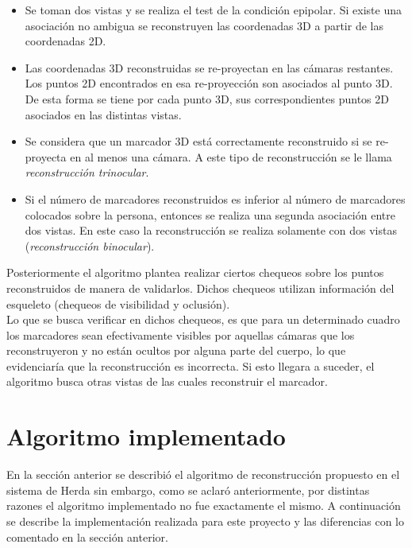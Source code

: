 \begin{itemize}
\item Se toman dos vistas y se realiza el test de la condición epipolar. Si existe una asociación no ambigua se reconstruyen  las coordenadas 3D a partir de las coordenadas 2D.

\item Las coordenadas 3D reconstruidas se re-proyectan en las cámaras restantes. Los puntos 2D encontrados en esa re-proyección son asociados al punto 3D. De esta forma se tiene por cada punto 3D, sus correspondientes puntos 2D asociados en las distintas vistas.\

\item Se considera que un marcador 3D está correctamente reconstruido si se re-proyecta en al menos una cámara. A este tipo de reconstrucción se le llama \textit{reconstrucción trinocular}.\\

\item Si el número de marcadores reconstruidos es inferior al número de marcadores colocados sobre la persona, entonces se realiza una segunda asociación entre dos vistas. En este caso la reconstrucción se realiza solamente con dos vistas (\textit{reconstrucción binocular}).\\

\end{itemize}

Posteriormente el algoritmo plantea realizar ciertos chequeos sobre los puntos reconstruidos de manera de validarlos. Dichos chequeos utilizan información del esqueleto (chequeos de visibilidad y oclusión).\\

Lo que se busca verificar en dichos chequeos, es que para un determinado cuadro los marcadores sean efectivamente visibles por aquellas cámaras que los reconstruyeron y no están ocultos por alguna parte del cuerpo, lo que evidenciaría que la reconstrucción es incorrecta. Si esto llegara a suceder, el algoritmo busca otras vistas de las cuales reconstruir el marcador.\\

\section{Algoritmo implementado}

En la sección anterior se describió el algoritmo de reconstrucción propuesto en el sistema de Herda sin embargo, como se aclaró anteriormente, por distintas razones el algoritmo implementado no fue exactamente el mismo. A continuación se describe la implementación realizada para este proyecto y las diferencias con lo comentado en la sección anterior.

